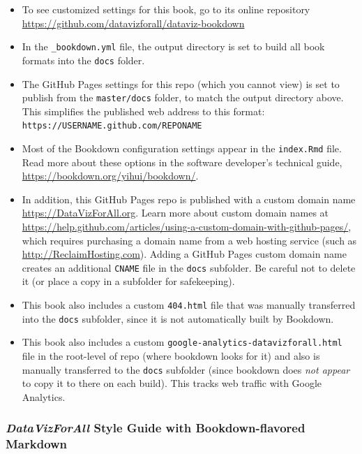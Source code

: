 \documentclass[
  english,
]{book}
\providecommand{\tightlist}{%
  \setlength{\itemsep}{0pt}\setlength{\parskip}{0pt}}
\begin{document}
\begin{itemize}
\tightlist
\item
  To see customized settings for this book, go to its online repository \url{https://github.com/datavizforall/dataviz-bookdown}
\item
  In the \texttt{\_bookdown.yml} file, the output directory is set to build all book formats into the \texttt{docs} folder.
\item
  The GitHub Pages settings for this repo (which you cannot view) is set to publish from the \texttt{master/docs} folder, to match the output directory above. This simplifies the published web address to this format: \texttt{https://USERNAME.github.com/REPONAME}
\item
  Most of the Bookdown configuration settings appear in the \texttt{index.Rmd} file. Read more about these options in the software developer's technical guide, \url{https://bookdown.org/yihui/bookdown/}.
\item
  In addition, this GitHub Pages repo is published with a custom domain name \url{https://DataVizForAll.org}. Learn more about custom domain names at \url{https://help.github.com/articles/using-a-custom-domain-with-github-pages/}, which requires purchasing a domain name from a web hosting service (such as \url{http://ReclaimHosting.com}). Adding a GitHub Pages custom domain name creates an additional \texttt{CNAME} file in the \texttt{docs} subfolder. Be careful not to delete it (or place a copy in a subfolder for safekeeping).
\item
  This book also includes a custom \texttt{404.html} file that was manually transferred into the \texttt{docs} subfolder, since it is not automatically built by Bookdown.
\item
  This book also includes a custom \texttt{google-analytics-datavizforall.html} file in the root-level of repo (where bookdown looks for it) and also is manually transferred to the \texttt{docs} subfolder (since bookdown does \emph{not appear} to copy it to there on each build). This tracks web traffic with Google Analytics.
\end{itemize}

\hypertarget{datavizforall-style-guide-with-bookdown-flavored-markdown}{%
\subsubsection*{\texorpdfstring{\emph{DataVizForAll} Style Guide with Bookdown-flavored Markdown}{DataVizForAll Style Guide with Bookdown-flavored Markdown}}\label{datavizforall-style-guide-with-bookdown-flavored-markdown}}
\end{document}
